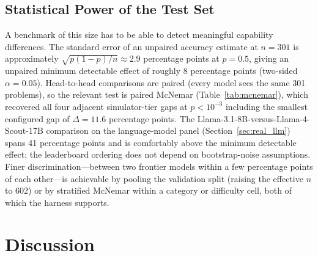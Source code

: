 \documentclass{article}
\begin{document}
\subsection{Statistical Power of the Test Set}
\label{sec:discriminability}

A benchmark of this size has to be able to detect meaningful capability differences. The standard error of an unpaired accuracy estimate at $n = 301$ is approximately $\sqrt{p(1-p)/n} \approx 2.9$ percentage points at $p = 0.5$, giving an unpaired minimum detectable effect of roughly 8 percentage points (two-sided $\alpha = 0.05$). Head-to-head comparisons are paired (every model sees the same 301 problems), so the relevant test is paired McNemar (Table~\ref{tab:mcnemar}), which recovered all four adjacent simulator-tier gaps at $p < 10^{-3}$ including the smallest configured gap of $\Delta = 11.6$ percentage points. The Llama-3.1-8B-versus-Llama-4-Scout-17B comparison on the language-model panel (Section~\ref{sec:real_llm}) spans 41 percentage points and is comfortably above the minimum detectable effect; the leaderboard ordering does not depend on bootstrap-noise assumptions. Finer discrimination---between two frontier models within a few percentage points of each other---is achievable by pooling the validation split (raising the effective $n$ to 602) or by stratified McNemar within a category or difficulty cell, both of which the harness supports.


\section{Discussion}
\label{sec:discussion}
\end{document}
